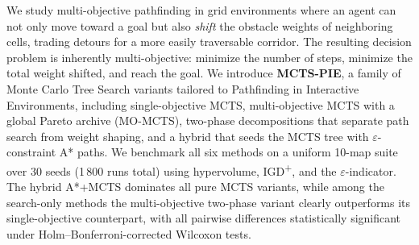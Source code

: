 We study multi-objective pathfinding in grid environments where an agent can not only move toward a goal but also \emph{shift} the obstacle weights of neighboring cells, trading detours for a more easily traversable corridor. The resulting decision problem is inherently multi-objective: minimize the number of steps, minimize the total weight shifted, and reach the goal. We introduce \textbf{MCTS-PIE}, a family of Monte Carlo Tree Search variants tailored to Pathfinding in Interactive Environments, including single-objective MCTS, multi-objective MCTS with a global Pareto archive (MO-MCTS), two-phase decompositions that separate path search from weight shaping, and a hybrid that seeds the MCTS tree with $\varepsilon$-constraint A* paths. We benchmark all six methods on a uniform 10-map suite over 30 seeds (1\,800 runs total) using hypervolume, IGD\textsuperscript{+}, and the $\varepsilon$-indicator. The hybrid A*+MCTS dominates all pure MCTS variants, while among the search-only methods the multi-objective two-phase variant clearly outperforms its single-objective counterpart, with all pairwise differences statistically significant under Holm--Bonferroni-corrected Wilcoxon tests.
